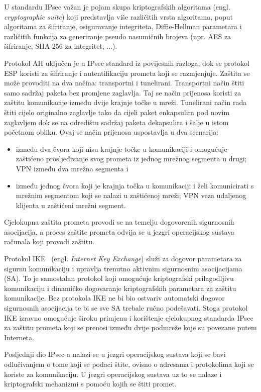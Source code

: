U standardu IPsec važan je pojam skupa kriptografskih algoritama
(engl. \emph{cryptographic suite}) koji predstavlja više različitih vrsta
algoritama, poput algoritama za šifriranje, osiguravanje integriteta,
Diffie-Hellman parametara i različitih funkcija za generiranje pseudo nasumičnih
brojeva (npr. AES za šifriranje, SHA-256 za integritet, ...).

Protokol AH uključen je u IPsec standard iz povijesnih razloga, dok se protokol
ESP koristi za šifriranje i autentifikaciju prometa koji se razmjenjuje.
Zaštita se može provoditi na dva načina: transportni i tunelirani. Transportni
način štiti samo sadržaj paketa bez promjene zaglavlja. Taj se način prijenosa
koristi za zaštitu komunikacije između dvije krajnje točke u mreži. Tunelirani
način rada štiti cijelo originalno zaglavlje tako da cijeli
paket enkapsulira pod novim zaglavljem dok se na odredištu sadržaj paketa
dekapsulira i šalje u istom početnom obliku. Ovaj se način prijenosa uspostavlja
u dva scenarija:
\begin{itemize}
    \item između dva čvora koji nisu krajnje točke u komunikaciji i omogućuje
    zaštićeno prosljeđivanje svog prometa iz jednog mrežnog segmenta u drugi;
    VPN između dva mrežna segmenta i
\item između jednog čvora koji je krajnja točka u komunikaciji i želi
    komunicirati s mrežnim segmentom koji se nalazi u zaštićenoj mreži; VPN
    veza udaljenog klijenta u zaštićeni mrežni segment.
\end{itemize}
Cjelokupna zaštita prometa provodi se na temelju dogovorenih sigurnosnih
asocijacija, a proces zaštite prometa odvija se u jezgri operacijskog sustava
računala koji provodi zaštitu.

Protokol IKE~\cite{rfc5996} (engl. \emph{Internet Key Exchange}) služi za
dogovor parametara za sigurnu komunikaciju i
upravlja trenutno aktivnim sigurnosnim asocijacijama (SA). To je samostalan
protokol koji omogućuje
kriptografski prilagodljivu komunikaciju i dinamičko dogovaranje kriptografskih
parametara za zaštitu komunikacije. Bez protokola IKE ne bi bio ostvariv
automatski dogovor sigurnosnih asocijacija te bi se sve SA trebale ručno
podešavati. Stoga protokol IKE izravno omogućuje široku primjenu i korištenje
cjelokupnog standarda IPsec za zaštitu prometa koji se prenosi
između dvije podmreže koje su povezane putem Interneta.

Posljednji dio IPsec-a nalazi se u jezgri operacijskog sustava koji se bavi
odlučivanjem o tome koji se podaci štite, ovisno o adresama i
protokolima koji se koriste za komunikaciju. U jezgri operacijskog sustava uz
to se nalaze i kriptografski mehanizmi s pomoću kojih se štiti promet.

